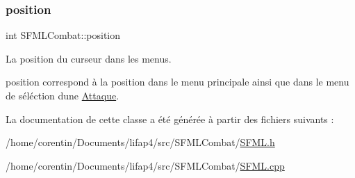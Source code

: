 \subsubsection{\texorpdfstring{position}{position}}
{\footnotesize\ttfamily int S\+F\+M\+L\+Combat\+::position\hspace{0.3cm}{\ttfamily [private]}}



La position du curseur dans les menus. 

position correspond à la position dans le menu principale ainsi que dans le menu de séléction d\textquotesingle{}une \hyperlink{class_attaque}{Attaque}. 

La documentation de cette classe a été générée à partir des fichiers suivants \+:\begin{DoxyCompactItemize}
\item 
/home/corentin/\+Documents/lifap4/src/\+S\+F\+M\+L\+Combat/\hyperlink{_s_f_m_l_8h}{S\+F\+M\+L.\+h}\item 
/home/corentin/\+Documents/lifap4/src/\+S\+F\+M\+L\+Combat/\hyperlink{_s_f_m_l_8cpp}{S\+F\+M\+L.\+cpp}\end{DoxyCompactItemize}

